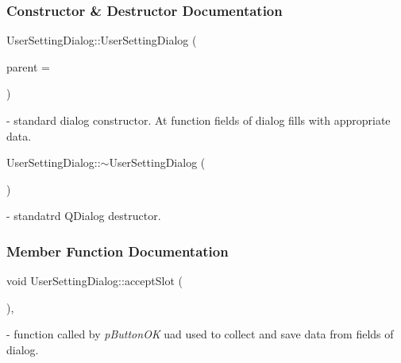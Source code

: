 \subsubsection{Constructor \& Destructor Documentation}
\mbox{\label{classUserSettingDialog_a8d3526dd76e3bf77fb8e02e1febeb8e4}} 
{\footnotesize\ttfamily User\+Setting\+Dialog\+::\texorpdfstring{User\+Setting\+Dialog}{UserSettingDialog} (\begin{DoxyParamCaption}\item[{Q\+Widget $\ast$}]{parent = {} }\end{DoxyParamCaption})\hspace{0.3cm}{\ttfamily [explicit]}} - standard dialog constructor. At function fields of dialog fills with appropriate data.

\mbox{\label{classUserSettingDialog_a49def01d834dfdd9df00ce9fd6c6f4dc}} 
{\footnotesize\ttfamily User\+Setting\+Dialog\+::\texorpdfstring{$\sim$\+User\+Setting\+Dialog}{~UserSettingDialog} (\begin{DoxyParamCaption}{ }\end{DoxyParamCaption})} - standatrd QDialog destructor.



\subsubsection{Member Function Documentation}
\mbox{\label{classUserSettingDialog_a2efff8a9633f90bd27c990180b87b104}} 
{\footnotesize\ttfamily void User\+Setting\+Dialog\+::\texorpdfstring{accept\+Slot}{acceptSlot} (\begin{DoxyParamCaption}{ }\end{DoxyParamCaption})\hspace{0.3cm}{\ttfamily [private]}, {\ttfamily [slot]}} - function called by \textit{pButtonOK} uad used to collect and save data from fields of dialog.

